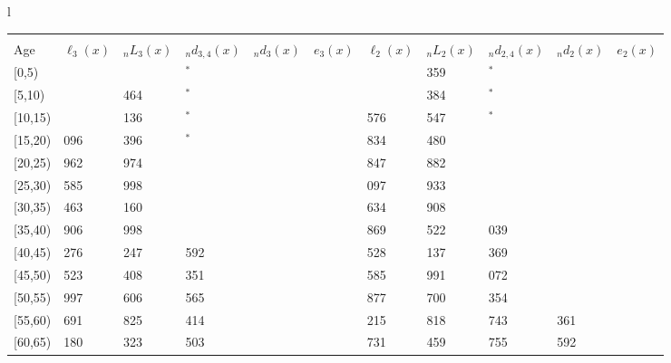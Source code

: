 \documentclass[
]{article}
\begin{document}
\begin{table}
\begin{tabular}[t]{l}
\end{tabular}
\centering
\begin{tabular}[t]{l}
\hline
\begin{tabular}{>{\raggedright\arraybackslash}p{.43in}>{\raggedleft\arraybackslash}p{.42in}>{\raggedleft\arraybackslash}p{.42in}>{\raggedleft\arraybackslash}p{.42in}>{\raggedleft\arraybackslash}p{.42in}>{\raggedleft\arraybackslash}p{.42in}>{\raggedleft\arraybackslash}p{.42in}>{\raggedleft\arraybackslash}p{.42in}>{\raggedleft\arraybackslash}p{.42in}>{\raggedleft\arraybackslash}p{.42in}>{\raggedleft\arraybackslash}p{.42in}}
\toprule
\multicolumn{1}{c}{ } & \multicolumn{5}{c}{(2) Lost mother only} & \multicolumn{5}{c}{(3) Lost father only} \\
\cmidrule(l{3pt}r{3pt}){2-6} \cmidrule(l{3pt}r{3pt}){7-11}
Age & $\ell_{3}(x)$ & ${}_nL_{3}(x)$ & ${}_nd_{3,4}(x)$ & ${}_nd_{3}(x)$ & $e_{3}(x)$ & $\ell_{2}(x)$ & ${}_nL_{2}(x)$ & ${}_nd_{2,4}(x)$ & ${}_nd_{2}(x)$ & $e_{2}(x)$\\
\midrule
{}[0,5) & 0 & 591 & 0$^{*}$ & 1 & 3 & 0 & 1 359 & 5$^{*}$ & 2 & 10\\
{}[5,10) & 363 & 2 464 & 16$^{*}$ & 0 & 3 & 737 & 5 384 & 13$^{*}$ & 1 & 10\\
{}[10,15) & 643 & 4 136 & 31$^{*}$ & 1 & 3 & 1 576 & 10 547 & 35$^{*}$ & 2 & 10\\
{}[15,20) & 1 096 & 7 396 & 68$^{*}$ & 5 & 3 & 2 834 & 18 480 & 85 & 13 & 10\\
{}[20,25) & 1 962 & 11 974 & 198 & 16 & 3 & 4 847 & 29 882 & 235 & 40 & 10\\
\addlinespace
{}[25,30) & 2 585 & 15 998 & 254 & 30 & 3 & 7 097 & 43 933 & 303 & 81 & 10\\
{}[30,35) & 3 463 & 22 160 & 519 & 54 & 3 & 9 634 & 60 908 & 696 & 148 & 9\\
{}[35,40) & 4 906 & 29 998 & 780 & 87 & 3 & 12 869 & 80 522 & 1 039 & 234 & 9\\
{}[40,45) & 6 276 & 38 247 & 1 592 & 134 & 2 & 16 528 & 104 137 & 2 369 & 365 & 8\\
{}[45,50) & 7 523 & 43 408 & 2 351 & 200 & 2 & 20 585 & 124 991 & 4 072 & 577 & 7\\
\addlinespace
{}[50,55) & 7 997 & 43 606 & 3 565 & 293 & 2 & 22 877 & 136 700 & 6 354 & 918 & 6\\
{}[55,60) & 7 691 & 38 825 & 4 414 & 395 & 1 & 23 215 & 133 818 & 8 743 & 1 361 & 5\\
{}[60,65) & 6 180 & 27 323 & 4 503 & 405 & 1 & 19 731 & 107 459 & 10 755 & 1 592 & 3\\

\end{tabular}
\end{tabular}
\end{table}
\end{document}
